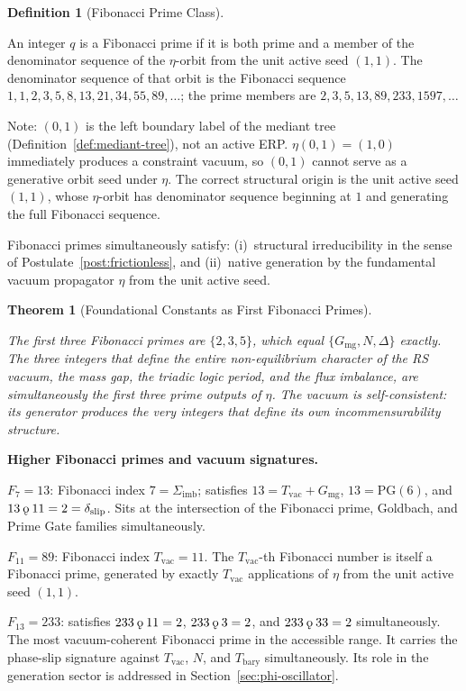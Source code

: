 \documentclass[11pt, letterpaper]{article}
\newcommand{\aop}{\eta}
\newcommand{\koppa}{\mathbin{\text{\rm\k{o}}}}
\newcommand{\Tbary}{T_{\mathrm{bary}}}
\newcommand{\Sigimb}{\Sigma_{\mathrm{imb}}}
\newcommand{\PG}{\mathrm{PG}}
\theoremstyle{definition}
\newtheorem{definition}{Definition}[section]
\theoremstyle{plain}
\newtheorem{theorem}{Theorem}[section]
\begin{document}
\begin{definition}[Fibonacci Prime Class]\label{def:fib-prime}
\begin{rsbox}
An integer $q$ is a Fibonacci prime if it is both prime and a
member of the denominator sequence of the $\aop$-orbit from the unit
active seed $(1,1)$.  The denominator sequence of that orbit is the
Fibonacci sequence $1,1,2,3,5,8,13,21,34,55,89,\ldots$; the prime members
are $2,3,5,13,89,233,1597,\ldots$

Note: $(0,1)$ is the left boundary label of the mediant tree
(Definition~\ref{def:mediant-tree}), not an active ERP.
$\aop(0,1)=(1,0)$ immediately produces a constraint vacuum, so $(0,1)$
cannot serve as a generative orbit seed under $\aop$.
The correct structural origin is the unit active seed $(1,1)$, whose
$\aop$-orbit has denominator sequence beginning at $1$ and generating
the full Fibonacci sequence.

Fibonacci primes simultaneously satisfy: (i)~structural irreducibility in
the sense of Postulate~\ref{post:frictionless}, and (ii)~native generation
by the fundamental vacuum propagator $\aop$ from the unit active seed.
\end{rsbox}
\end{definition}

\begin{theorem}[Foundational Constants as First Fibonacci Primes]
\label{thm:fib-primes}
\begin{rsbox}
The first three Fibonacci primes are $\{2,3,5\}$, which equal
$\{G_{\mathrm{mg}},N,\Delta\}$ exactly.  The three integers that define the
entire non-equilibrium character of the RS vacuum, the mass gap, the
triadic logic period, and the flux imbalance, are simultaneously the first
three prime outputs of $\aop$.  The vacuum is self-consistent: its generator
produces the very integers that define its own incommensurability structure.
\end{rsbox}
\end{theorem}

\begin{observebox}
\textbf{Higher Fibonacci primes and vacuum signatures.}

$F_7=13$: Fibonacci index $7=\Sigimb$; satisfies $13=T_{\mathrm{vac}}
+G_{\mathrm{mg}}$, $13=\PG(6)$, and $13\koppa 11=2=\delta_{\mathrm{slip}}$.
Sits at the intersection of the Fibonacci prime, Goldbach, and Prime Gate
families simultaneously.

$F_{11}=89$: Fibonacci index $T_{\mathrm{vac}}=11$.  The $T_{\mathrm{vac}}$-th
Fibonacci number is itself a Fibonacci prime, generated by exactly
$T_{\mathrm{vac}}$ applications of $\aop$ from the unit active seed $(1,1)$.

$F_{13}=233$: satisfies $233\koppa 11=2$, $233\koppa 3=2$, and
$233\koppa 33=2$ simultaneously. The most vacuum-coherent Fibonacci prime
in the accessible range.  It carries the phase-slip signature against
$T_{\mathrm{vac}}$, $N$, and $\Tbary$ simultaneously.  Its role in the
generation sector is addressed in Section~\ref{sec:phi-oscillator}.
\end{observebox}
\end{document}

